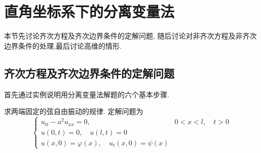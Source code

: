 \section{直角坐标系下的分离变量法}
\label{sec:cartesian}


本节先讨论齐次方程及齐次边界条件的定解问题, 随后讨论对非齐次方程及非齐次边界条件的处理,最后讨论高维的情形.

\subsection{齐次方程及齐次边界条件的定解问题}
首先通过实例说明用分离变量法解题的六个基本步骤.


求两端固定的弦自由振动的规律.
定解问题为
\begin{equation}
    \begin{cases}u_{t t}-a^{2} u_{x x}=0, & 0<x<l, \quad t>0 
        \\ u(0, t)=0, \quad u(l, t)=0 & 
        \\ u(x, 0)=\varphi(x), \quad u_{t}(x, 0)=\psi(x) & 
    \end{cases}
    \label{eq:string_vibration_equation}
\end{equation}

